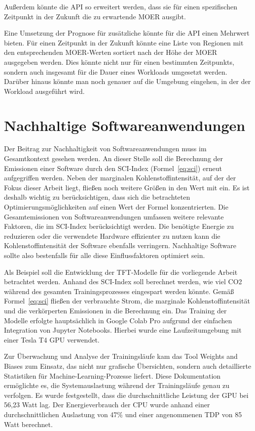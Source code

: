 Außerdem könnte die \ac{API} so erweitert werden, dass sie für einen spezifischen Zeitpunkt in der Zukunft die zu erwartende \ac{MOER} ausgibt.

Eine Umsetzung der Prognose für zusätzliche könnte für die \ac{API} einen Mehrwert bieten.
Für einen Zeitpunkt in der Zukunft könnte eine Liste von Regionen mit den entsprechenden \ac{MOER}-Werten sortiert nach der Höhe der \ac{MOER} ausgegeben werden.
Dies könnte nicht nur für einen bestimmten Zeitpunkts, sondern auch insgesamt für die Dauer eines Workloads umgesetzt werden.
Darüber hinaus könnte man noch genauer auf die Umgebung eingehen, in der der Workload ausgeführt wird.
\section{Nachhaltige Softwareanwendungen}
Der Beitrag zur Nachhaltigkeit von Softwareanwendungen muss im Gesamtkontext gesehen werden.
An dieser Stelle soll die Berechnung der Emissionen einer Software durch den \ac{SCI}-Index (Formel~\ref{eq:sci}) erneut aufgegriffen werden.
Neben der marginalen Kohlenstoffintensität, auf der der Fokus dieser Arbeit liegt, fließen noch weitere Größen in den Wert mit ein.
Es ist deshalb wichtig zu berücksichtigen, dass sich die betrachteten Optimierungsmöglichkeiten auf einen Wert der Formel konzentrierten.
Die Gesamtemissionen von Softwareanwendungen umfassen weitere relevante Faktoren, die im \ac{SCI}-Index berücksichtigt werden.
Die benötigte Energie zu reduzieren oder die verwendete Hardware effizienter zu nutzen kann die Kohlenstoffintensität der Software ebenfalls verringern.
Nachhaltige Software sollte also bestenfalls für alle diese Einflussfaktoren optimiert sein.

Als Beispiel soll die Entwicklung der \ac{TFT}-Modelle für die vorliegende Arbeit betrachtet werden.
Anhand des \ac{SCI}-Index soll berechnet werden, wie viel \ac{CO2} während des gesamten Trainingsprozesses eingespart werden könnte.
Gemäß Formel~\ref{eq:sci} fließen der verbrauchte Strom, die marginale Kohlenstoffintensität und die verkörperten Emissionen in die Berechnung ein.
Das Training der Modelle erfolgte hauptsächlich in Google Colab Pro aufgrund der einfachen Integration von Jupyter Notebooks.
Hierbei wurde eine Laufzeitumgebung mit einer Tesla T4 \ac{GPU} verwendet.

Zur Überwachung und Analyse der Trainingsläufe kam das Tool Weights and Biases zum Einsatz, das nicht nur grafische Übersichten, sondern auch detaillierte Statistiken für Machine-Learning-Prozesse liefert.
Diese Dokumentation ermöglichte es, die Systemauslastung während der Trainingsläufe genau zu verfolgen.
Es wurde festgestellt, dass die durchschnittliche Leistung der \ac{GPU} bei 56,23 Watt lag.
Der Energieverbrauch der \ac{CPU} wurde anhand einer durchschnittlichen Auslastung von 47\% und einer angenommenen \ac{TDP} von 85 Watt berechnet.

